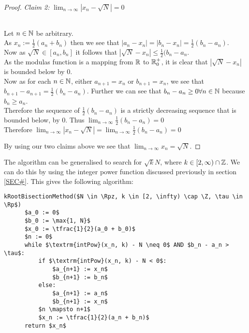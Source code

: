 \begin{proof}
\textit{Claim 2:} \(\lim_{n\to\infty}|x_n - \sqrt{N}| = 0\)
\begin{subproof}\\
Let \(n \in \mathbb{N}\) be arbitrary.\\
As \(x_n := \frac{1}{2}(a_n + b_n)\) then we see that \(|a_n - x_n| = |b_n - x_n| = \frac{1}{2}(b_n - a_n)\).\\
Now as \(\sqrt{N} \in [a_n, b_n]\) it follows that \(|\sqrt{N} - x_n| \le \frac{1}{2}(b_n - a_n\).\\
As the modulas function is a mapping from \(\mathbb{R}\) to \(\mathbb{R}^+_0\), it is clear that \(|\sqrt{N} - x_n|\) is bounded below by 0.\\
Now as for each \(n \in \mathbb{N}\), either \(a_{n+1} = x_n\) or \(b_{n+1} = x_n\), we see that \(b_{n+1} - a_{n+1} = \frac{1}{2}(b_n - a_n)\). Further we can see that \(b_n - a_n \ge 0 \forall n \in \mathbb{N}\) because \(b_n \ge a_n\).\\
Therefore the sequence of \(\frac{1}{2}(b_n - a_n)\) is a strictly decreasing sequence that is bounded below, by 0. Thus \(\lim_{n\to\infty} \frac{1}{2}(b_n - a_n) = 0\)\\ 
Therefore \(\lim_{n\to\infty} |x_n - \sqrt{N}| = \lim_{n\to\infty}\frac{1}{2}(b_n - a_n) = 0\)
\end{subproof}

By using our two claims above we see that \(\lim_{n\to\infty} x_n = \sqrt{N}\).
\end{proof}

The algorithm can be generalised to search for \(\sqrt{k}{N}\), where \(k \in [2,\infty) \cap \mathbb{Z}\). We can do this by using the integer power function discussed previously in section \ref{SEC#}. This gives the following algorithm:
 
\label{PCD_"Bisection Method for General Roots"}
\begin{lstlisting}[frame=single,mathescape,caption={Bisection Method for General Roots}]
  kRootBisectionMethod($N \in \Rpz, k \in [2, \infty) \cap \Z, \tau \in \Rp$)
      $a_0 := 0$
      $b_0 := \max{1, N}$
      $x_0 := \tfrac{1}{2}(a_0 + b_0)$
      $n := 0$
      while $\textrm{intPow}(x_n, k) - N \neq 0$ AND $b_n - a_n > \tau$:
          if $\textrm{intPow}(x_n, k) - N < 0$:
              $a_{n+1} := x_n$
              $b_{n+1} := b_n$
          else:
              $a_{n+1} := a_n$
              $b_{n+1} := x_n$
          $n \mapsto n+1$
          $x_n := \tfrac{1}{2}(a_n + b_n)$
      return $x_n$
\end{lstlisting}\\

